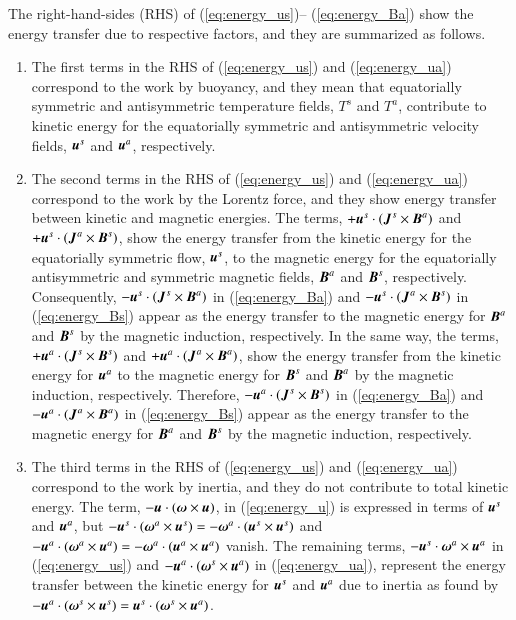 {\color{teal}
The right-hand-sides (RHS) of (\ref{eq:energy_us})-- (\ref{eq:energy_Ba}) show the energy transfer due to respective factors, and they are summarized as follows.
\begin{enumerate}
\item 
The first terms in the RHS of (\ref{eq:energy_us}) and (\ref{eq:energy_ua}) correspond to the work by buoyancy, and they mean that equatorially symmetric and antisymmetric temperature fields, $T^s$ and $T^a$, contribute to kinetic energy for the equatorially symmetric and antisymmetric velocity fields, $\mbox{\boldmath$u$}^s$ and $\mbox{\boldmath$u$}^a$, respectively.

\item 
The second terms in the RHS of (\ref{eq:energy_us}) and (\ref{eq:energy_ua}) correspond to the work by the Lorentz force, and they show energy transfer between kinetic and magnetic energies.
The terms, $+\mbox{\boldmath$u$}^s \cdot (\mbox{\boldmath$J$}^s \times \mbox{\boldmath$B$}^a)$ and $+\mbox{\boldmath$u$}^s \cdot (\mbox{\boldmath$J$}^a \times \mbox{\boldmath$B$}^s)$, show the energy transfer from the kinetic energy for the equatorially symmetric flow, $\mbox{\boldmath$u$}^s$, to the magnetic energy for the equatorially antisymmetric and symmetric magnetic fields, $\mbox{\boldmath$B$}^a$  and $\mbox{\boldmath$B$}^s$, respectively. 
Consequently, $-\mbox{\boldmath$u$}^s \cdot (\mbox{\boldmath$J$}^s \times \mbox{\boldmath$B$}^a)$ in (\ref{eq:energy_Ba}) and $-\mbox{\boldmath$u$}^s \cdot (\mbox{\boldmath$J$}^a \times \mbox{\boldmath$B$}^s)$ in (\ref{eq:energy_Bs}) appear as the energy transfer to the magnetic energy for $\mbox{\boldmath$B$}^a$ and $\mbox{\boldmath$B$}^s$ by the magnetic induction, respectively.
In the same way, the terms, $+\mbox{\boldmath$u$}^a \cdot (\mbox{\boldmath$J$}^s \times \mbox{\boldmath$B$}^s)$ and $+\mbox{\boldmath$u$}^a \cdot (\mbox{\boldmath$J$}^a \times \mbox{\boldmath$B$}^a)$, show the energy transfer from the kinetic energy for $\mbox{\boldmath$u$}^a$ to the magnetic energy for $\mbox{\boldmath$B$}^s$ and $\mbox{\boldmath$B$}^a$ by the magnetic induction, respectively.
Therefore, $-\mbox{\boldmath$u$}^a \cdot (\mbox{\boldmath$J$}^s \times \mbox{\boldmath$B$}^s)$ in (\ref{eq:energy_Ba}) and $-\mbox{\boldmath$u$}^a \cdot (\mbox{\boldmath$J$}^a \times \mbox{\boldmath$B$}^a)$ in (\ref{eq:energy_Bs}) appear as the energy transfer to the magnetic energy for $\mbox{\boldmath$B$}^a$ and $\mbox{\boldmath$B$}^s$ by the magnetic induction, respectively.

\item 
The third terms in the RHS of (\ref{eq:energy_us}) and (\ref{eq:energy_ua}) correspond to the work by inertia, and they do not contribute to total kinetic energy.
The term, $-\mbox{\boldmath$u$} \cdot (\mbox{\boldmath$\omega$} \times \mbox{\boldmath$u$})$, in (\ref{eq:energy_u}) is expressed in terms of $\mbox{\boldmath$u$}^s$ and $\mbox{\boldmath$u$}^a$, but $-\mbox{\boldmath$u$}^s \cdot (\mbox{\boldmath$\omega$}^a \times \mbox{\boldmath$u$}^s) = -\mbox{\boldmath$\omega$}^a \cdot (\mbox{\boldmath$u$}^s \times \mbox{\boldmath$u$}^s)$ and $-\mbox{\boldmath$u$}^a \cdot (\mbox{\boldmath$\omega$}^a \times \mbox{\boldmath$u$}^a) = -\mbox{\boldmath$\omega$}^a \cdot (\mbox{\boldmath$u$}^a \times \mbox{\boldmath$u$}^a)$ vanish. 
The remaining terms, $-\mbox{\boldmath$u$}^s \cdot \mbox{\boldmath$\omega$}^a \times \mbox{\boldmath$u$}^a$ in (\ref{eq:energy_us}) and $-\mbox{\boldmath$u$}^a \cdot (\mbox{\boldmath$\omega$}^s \times \mbox{\boldmath$u$}^a)$ in (\ref{eq:energy_ua}), represent the energy transfer between the kinetic energy for $\mbox{\boldmath$u$}^s$ and $\mbox{\boldmath$u$}^a$ due to inertia as found by $-\mbox{\boldmath$u$}^a \cdot (\mbox{\boldmath$\omega$}^s \times \mbox{\boldmath$u$}^s) = \mbox{\boldmath$u$}^s \cdot (\mbox{\boldmath$\omega$}^s \times \mbox{\boldmath$u$}^a)$.


\end{enumerate}}

